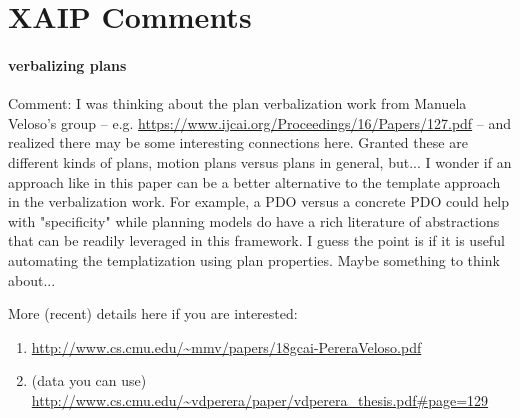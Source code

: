 
\section{XAIP Comments}

\paragraph{verbalizing plans}

	Comment: I was thinking about the plan verbalization work from Manuela Veloso's group 
	-- e.g. \url{https://www.ijcai.org/Proceedings/16/Papers/127.pdf} 
	-- and realized there may be some interesting connections here. 
	Granted these are different kinds of plans, motion plans versus plans in general, 
	but...  I wonder if an approach like in this paper can be a better alternative 
	to the template approach in the verbalization work. For example, a PDO versus 
	a concrete PDO could help with "specificity" while planning models do have 
	a rich literature of abstractions that can be readily leveraged in this framework. 
	I guess the point is if it is useful automating the templatization using plan properties. 
	Maybe something to think about... 

	More (recent) details here if you are interested:
	\begin{enumerate}
		\item \url{http://www.cs.cmu.edu/~mmv/papers/18gcai-PereraVeloso.pdf}
		\item (data you can use) \url{http://www.cs.cmu.edu/~vdperera/paper/vdperera_thesis.pdf#page=129}
	\end{enumerate}
